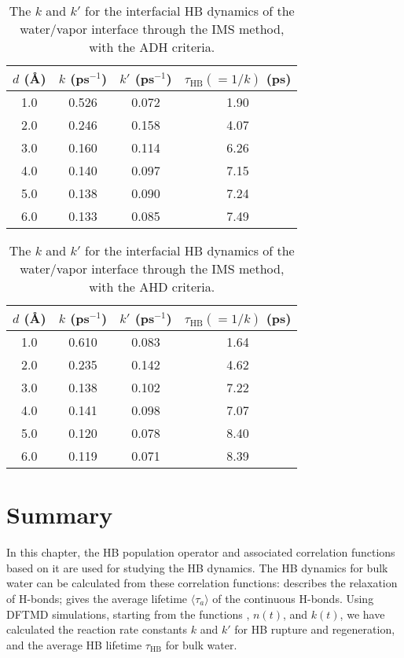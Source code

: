 \begin{table}[H]
\centering
\caption{\label{tab:k_k_prime_tau_128w_pure_ihb_scheme1_ADH} 
    The $k$ and $k'$ for the interfacial HB dynamics of the water/vapor interface through the IMS method, with the ADH criteria.} 
\begin{tabular}{cccc}
 $d$ (\AA) & $k$ (ps$^{-1}$) & $k'$ (ps$^{-1}$) & $\tau_{\text{HB}} (=1/k)$ (ps) \\
\hline
  1.0 & 0.526 & 0.072 & 1.90  \\
  2.0 & 0.246 & 0.158 & 4.07  \\
  3.0 & 0.160 & 0.114 & 6.26  \\
  4.0 & 0.140 & 0.097 & 7.15  \\
  5.0 & 0.138 & 0.090 & 7.24  \\
  6.0 & 0.133 & 0.085 & 7.49  \\
\end{tabular}
\end{table}
\begin{table}[H]
\centering
\caption{\label{tab:k_k_prime_tau_128w_pure_ihb_AHD} 
    The $k$ and $k'$ for the interfacial HB dynamics of the water/vapor interface through the IMS method, with the AHD criteria.} 
\begin{tabular}{cccc}
 $d$ (\AA) & $k$ (ps$^{-1}$) & $k'$ (ps$^{-1}$) & $\tau_{\text{HB}} (=1/k)$ (ps) \\
\hline
  1.0 & 0.610 & 0.083 & 1.64  \\
  2.0 & 0.235 & 0.142 & 4.62  \\
  3.0 & 0.138 & 0.102 & 7.22  \\
  4.0 & 0.141 & 0.098 & 7.07  \\
  5.0 & 0.120 & 0.078 & 8.40  \\
  6.0 & 0.119 & 0.071 & 8.39  \\
\end{tabular}
\end{table}

\section{Summary}
In this chapter, the HB population operator and associated correlation functions based on it are used for studying the HB dynamics. 
The HB dynamics for bulk water can be calculated from these correlation functions: 
\CHB describes the relaxation of H-bonds; \SHB gives the average lifetime $\langle \tau_a \rangle$ of the continuous H-bonds. 
Using DFTMD simulations, starting from the functions \CHB, $n(t)$, and $k(t)$, 
we have calculated the reaction rate constants $k$ and $k'$ for HB rupture and regeneration, and the average HB lifetime $\tau_{\text{HB}}$ for bulk water.

